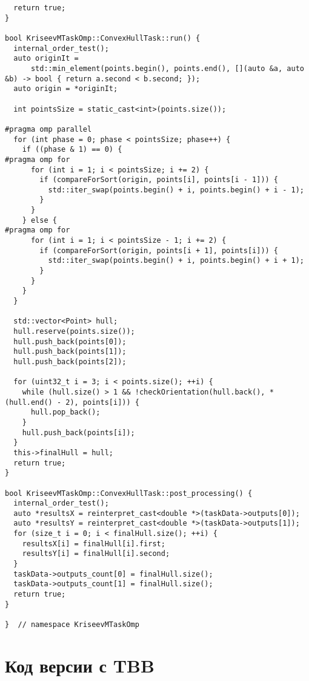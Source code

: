\documentclass[a4paper]{article}
\begin{document}
\begin{lstlisting}
  return true;
}

bool KriseevMTaskOmp::ConvexHullTask::run() {
  internal_order_test();
  auto originIt =
      std::min_element(points.begin(), points.end(), [](auto &a, auto &b) -> bool { return a.second < b.second; });
  auto origin = *originIt;

  int pointsSize = static_cast<int>(points.size());

#pragma omp parallel
  for (int phase = 0; phase < pointsSize; phase++) {
    if ((phase & 1) == 0) {
#pragma omp for
      for (int i = 1; i < pointsSize; i += 2) {
        if (compareForSort(origin, points[i], points[i - 1])) {
          std::iter_swap(points.begin() + i, points.begin() + i - 1);
        }
      }
    } else {
#pragma omp for
      for (int i = 1; i < pointsSize - 1; i += 2) {
        if (compareForSort(origin, points[i + 1], points[i])) {
          std::iter_swap(points.begin() + i, points.begin() + i + 1);
        }
      }
    }
  }

  std::vector<Point> hull;
  hull.reserve(points.size());
  hull.push_back(points[0]);
  hull.push_back(points[1]);
  hull.push_back(points[2]);

  for (uint32_t i = 3; i < points.size(); ++i) {
    while (hull.size() > 1 && !checkOrientation(hull.back(), *(hull.end() - 2), points[i])) {
      hull.pop_back();
    }
    hull.push_back(points[i]);
  }
  this->finalHull = hull;
  return true;
}

bool KriseevMTaskOmp::ConvexHullTask::post_processing() {
  internal_order_test();
  auto *resultsX = reinterpret_cast<double *>(taskData->outputs[0]);
  auto *resultsY = reinterpret_cast<double *>(taskData->outputs[1]);
  for (size_t i = 0; i < finalHull.size(); ++i) {
    resultsX[i] = finalHull[i].first;
    resultsY[i] = finalHull[i].second;
  }
  taskData->outputs_count[0] = finalHull.size();
  taskData->outputs_count[1] = finalHull.size();
  return true;
}

}  // namespace KriseevMTaskOmp
\end{lstlisting}

\section{Код версии с TBB}
\end{document}

